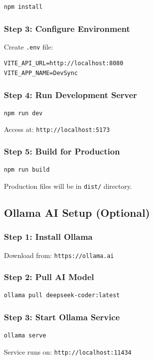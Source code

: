 \documentclass[12pt,a4paper]{article}
\begin{document}
    \begin{verbatim}
npm install
    \end{verbatim}

    \subsubsection{Step 3: Configure Environment}

    Create \texttt{.env} file:

    \begin{verbatim}
VITE_API_URL=http://localhost:8080
VITE_APP_NAME=DevSync
    \end{verbatim}

    \subsubsection{Step 4: Run Development Server}

    \begin{verbatim}
npm run dev
    \end{verbatim}

    Access at: \texttt{http://localhost:5173}

    \subsubsection{Step 5: Build for Production}

    \begin{verbatim}
npm run build
    \end{verbatim}

    Production files will be in \texttt{dist/} directory.

    \subsection{Ollama AI Setup (Optional)}

    \subsubsection{Step 1: Install Ollama}

    Download from: \texttt{https://ollama.ai}

    \subsubsection{Step 2: Pull AI Model}

    \begin{verbatim}
ollama pull deepseek-coder:latest
    \end{verbatim}

    \subsubsection{Step 3: Start Ollama Service}

    \begin{verbatim}
ollama serve
    \end{verbatim}

    Service runs on: \texttt{http://localhost:11434}
\end{document}
